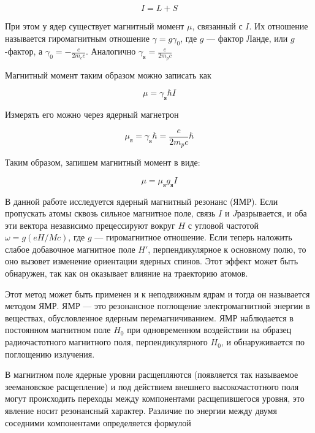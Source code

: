 \documentclass[12pt]{kiarticle} %
\begin{document}
	\begin{equation}\label{}
	I = L + S
	\end{equation} 
	
	При этом у ядер существует магнитный момент $ \mu $, связанный с $ I $. Их отношение называется гиромагнитным отношение $ \gamma = g \gamma_0 $, где $ g $ --- фактор Ланде, или $ g $-фактор, а $ \gamma_0 = -\frac{e}{2m_ec} $. Аналогично  $ \gamma_я = \frac{e}{2m_pc} $
	
	Магнитный момент таким образом можно записать как 
	
	\begin{equation}\label{}
	\mu = \gamma_я \hbar I 
	\end{equation}
	
	Измерять его можно через ядерный магнетрон
	
	\begin{equation}\label{}
	\mu_я = \gamma_я \hbar = \frac{e}{2m_pc} \hbar 
	\end{equation}
	
	Таким образом, запишем магнитный момент в виде:
	
	\begin{equation}\label{mu}
	\mu = \mu_я g_я I
	\end{equation}

	
	В данной работе исследуется ядерный магнитный резонанс (ЯМР). Если пропускать
	атомы сквозь сильное магнитное поле, связь $ I $ и $ J  $разрывается, и
	оба эти вектора независимо прецессируют вокруг $ H $ с угловой частотой
	$ \omega = g(eH/Mc) $, где $ g $ --- гиромагнитное отношение. Если теперь наложить слабое добавочное магнитное поле $ H' $, перпендикулярное к основному полю, то оно вызовет изменение ориентации ядерных спинов.
	Этот эффект может быть обнаружен, так как он оказывает влияние
	на траекторию атомов.
	
	Этот метод может быть применен и к неподвижным ядрам и тогда он называется методом ЯМР. ЯМР --- это резонансное поглощение
	электромагнитной энергии в веществах, обусловленное ядерным перемагничиванием. ЯМР наблюдается в постоянном магнитном поле $ H_0 $ при одновременном воздействии на образец радиочастотного магнитного поля, перпендикулярного $ H_0 $, и обнаруживается по поглощению излучения. 
	
	В магнитном поле ядерные уровни расщепляются (появляется так называемое зеемановское расщепление) и под действием внешнего высокочастотного поля могут происходить переходы между компонентами расщепившегося уровня, это явление носит резонансный характер. Различие по энергии между двумя соседними компонентами определяется формулой
	
\end{document}
